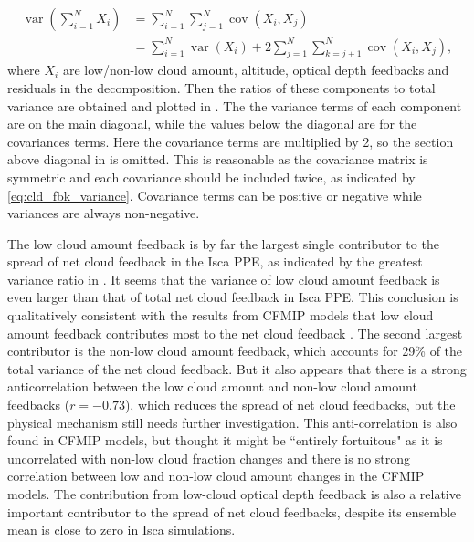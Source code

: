 \begin{equation}
    \begin{aligned}
    \operatorname{var}\left(\sum_{i=1}^{N} X_{i}\right) &=\sum_{i=1}^{N} \sum_{j=1}^{N} \operatorname{cov}\left(X_{i}, X_{j}\right) \\
    &=\sum_{i=1}^{N} \operatorname{var}\left(X_{i}\right)+2 \sum_{j=1}^{N} \sum_{k=j+1}^{N} \operatorname{cov}\left(X_{i}, X_{j}\right),
    \end{aligned}
    \label{eq:cld_fbk_variance}
\end{equation}
where $X_i$ are low/non-low cloud amount, altitude, optical depth feedbacks and residuals in the decomposition. Then the ratios of these components to total variance are obtained and plotted in . The the variance terms of each component are on the main diagonal, while the values below the diagonal are for the covariances terms. Here the covariance terms are multiplied by 2, so the section above diagonal in  is omitted. This is reasonable as the covariance matrix is symmetric and each covariance should be included twice, as indicated by \eqref{eq:cld_fbk_variance}. Covariance terms can be positive or negative while variances are always non-negative. 

The low cloud amount feedback is by far the largest single contributor to the spread of net cloud feedback in the Isca PPE, as indicated by the greatest variance ratio in . It seems that the variance of low cloud amount feedback is even larger than that of total net cloud feedback in Isca PPE. This conclusion is qualitatively consistent with the results from CFMIP models that low cloud amount feedback contributes most to the net cloud feedback \citep[][]{Zelinka2016insights}. The second largest contributor is the non-low cloud amount feedback, which accounts for 29\% of the total variance of the net cloud feedback. But it also appears that there is a strong anticorrelation between the low cloud amount and non-low cloud amount feedbacks ($r=-0.73$), which reduces the spread of net cloud feedbacks, but the physical mechanism still needs further investigation. This anti-correlation is also found in CFMIP models, but \cite{Zelinka2016insights} thought it might be ``entirely fortuitous" as it is uncorrelated with non-low cloud fraction changes and there is no strong correlation between low and non-low cloud amount changes in the CFMIP models. The contribution from low-cloud optical depth feedback is also a relative important contributor to the spread of net cloud feedbacks, despite its ensemble mean is close to zero in Isca simulations.

